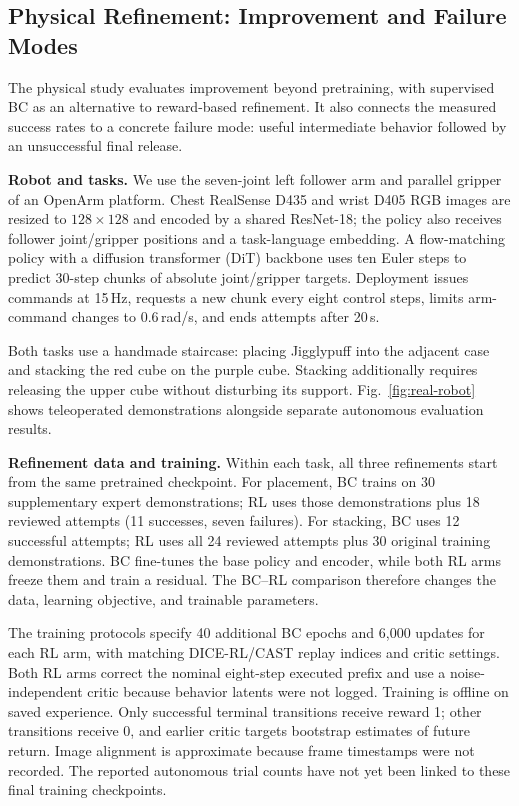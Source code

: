 \subsection{Physical Refinement: Improvement and Failure Modes}
\label{sec:exp-real-robot}

The physical study evaluates improvement beyond pretraining, with supervised
BC as an alternative to reward-based refinement. It also connects the
measured success rates to a concrete failure mode: useful intermediate
behavior followed by an unsuccessful final release.

\textbf{Robot and tasks.}
We use the seven-joint left follower arm and parallel gripper of an
OpenArm platform. Chest RealSense D435 and wrist D405 RGB images are
resized to $128\times128$ and encoded by a shared ResNet-18; the policy
also receives follower joint/gripper positions and a task-language embedding.
A flow-matching policy with a diffusion transformer (DiT) backbone uses
ten Euler steps to predict 30-step chunks of absolute joint/gripper targets.
Deployment issues commands at 15\,Hz, requests a new chunk every eight
control steps, limits arm-command changes to 0.6\,rad/s, and ends attempts
after 20\,s.

Both tasks use a handmade staircase: placing Jigglypuff into the adjacent
case and stacking the red cube on the purple cube. Stacking additionally
requires releasing the upper cube without disturbing its support.
Fig.~\ref{fig:real-robot} shows teleoperated demonstrations alongside
separate autonomous evaluation results.

\textbf{Refinement data and training.}
Within each task, all three refinements start from the same pretrained
checkpoint. For placement, BC trains on
30 supplementary expert demonstrations; RL uses those demonstrations plus
18 reviewed attempts (11 successes, seven failures). For stacking, BC uses
12 successful attempts; RL uses all 24 reviewed attempts plus 30 original
training demonstrations. BC fine-tunes the base policy and encoder, while
both RL arms freeze them and train a residual. The BC--RL comparison
therefore changes the data, learning objective, and trainable parameters.

The training protocols specify 40 additional BC epochs and 6,000 updates
for each RL arm, with matching DICE-RL/CAST replay indices and critic
settings. Both RL arms correct the nominal eight-step executed prefix
and use a noise-independent critic because behavior latents were not logged.
Training is offline on saved experience. Only successful terminal
transitions receive reward 1; other transitions receive 0, and earlier
critic targets bootstrap estimates of future return. Image alignment is
approximate because frame timestamps were not recorded. The reported
autonomous trial counts have not yet been linked to these final training
checkpoints.

